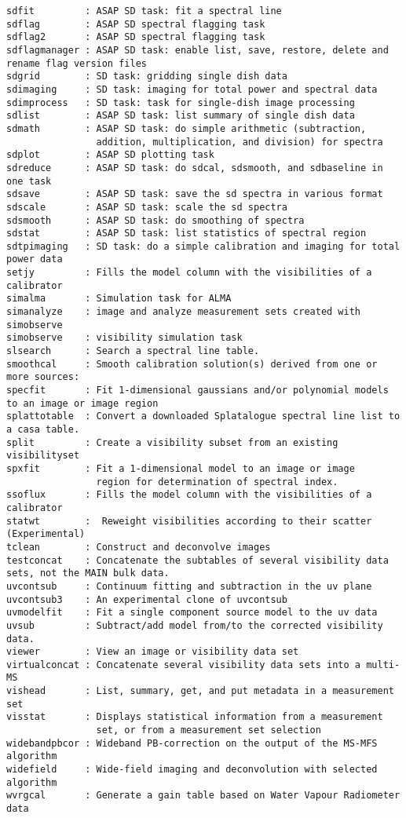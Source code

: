 \begin{verbatim}
sdfit         : ASAP SD task: fit a spectral line
sdflag        : ASAP SD spectral flagging task 
sdflag2       : ASAP SD spectral flagging task 
sdflagmanager : ASAP SD task: enable list, save, restore, delete and rename flag version files
sdgrid        : SD task: gridding single dish data
sdimaging     : SD task: imaging for total power and spectral data
sdimprocess   : SD task: task for single-dish image processing
sdlist        : ASAP SD task: list summary of single dish data
sdmath        : ASAP SD task: do simple arithmetic (subtraction,
                addition, multiplication, and division) for spectra
sdplot        : ASAP SD plotting task 
sdreduce      : ASAP SD task: do sdcal, sdsmooth, and sdbaseline in one task
sdsave        : ASAP SD task: save the sd spectra in various format
sdscale       : ASAP SD task: scale the sd spectra
sdsmooth      : ASAP SD task: do smoothing of spectra
sdstat        : ASAP SD task: list statistics of spectral region
sdtpimaging   : SD task: do a simple calibration and imaging for total power data 
setjy         : Fills the model column with the visibilities of a calibrator
simalma       : Simulation task for ALMA 
simanalyze    : image and analyze measurement sets created with simobserve
simobserve    : visibility simulation task
slsearch      : Search a spectral line table.
smoothcal     : Smooth calibration solution(s) derived from one or more sources:
specfit       : Fit 1-dimensional gaussians and/or polynomial models to an image or image region
splattotable  : Convert a downloaded Splatalogue spectral line list to a casa table.
split         : Create a visibility subset from an existing visibilityset
spxfit        : Fit a 1-dimensional model to an image or image 
                region for determination of spectral index.
ssoflux       : Fills the model column with the visibilities of a calibrator
statwt        :  Reweight visibilities according to their scatter (Experimental)
tclean        : Construct and deconvolve images
testconcat    : Concatenate the subtables of several visibility data sets, not the MAIN bulk data.
uvcontsub     : Continuum fitting and subtraction in the uv plane
uvcontsub3    : An experimental clone of uvcontsub
uvmodelfit    : Fit a single component source model to the uv data
uvsub         : Subtract/add model from/to the corrected visibility data.
viewer        : View an image or visibility data set
virtualconcat : Concatenate several visibility data sets into a multi-MS
vishead       : List, summary, get, and put metadata in a measurement set
visstat       : Displays statistical information from a measurement
                set, or from a measurement set selection
widebandpbcor : Wideband PB-correction on the output of the MS-MFS algorithm
widefield     : Wide-field imaging and deconvolution with selected algorithm
wvrgcal       : Generate a gain table based on Water Vapour Radiometer data
\end{verbatim}
\normalsize

